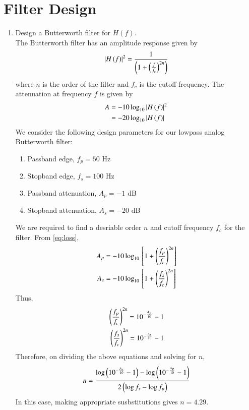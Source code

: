 \documentclass[journal,12pt,twocolumn]{IEEEtran}
\renewcommand\thesection{\arabic{section}}
\begin{document}
\section{Filter Design}
\begin{enumerate}[label=\thesection.\arabic*
	,ref=\thesection.\theenumi]
	\item Design a Butterworth filter for $H(f)$.\\
	\solution The Butterworth filter has an amplitude response
	given by
	\begin{align}
		\left\vert H\left(f\right)\right\vert^2 = \frac{1}{\left(1 + \left(\frac{f}{f_c}\right)^{2n}\right)}
	\end{align}
	where $n$ is the order of the filter and $f_c$ is the cutoff
	frequency. The attenuation at frequency $f$ is given by 
	\begin{align}
		A &= -10\log_{10}\left\vert H\left(f\right)\right\vert^2 \\
		&= -20\log_{10}\left\vert H\left(f\right)\right\vert
		\label{eq:loss}
	\end{align}
	We consider the following design parameters for our
	lowpass analog Butterworth filter:
	\begin{enumerate}
		\item Passband edge, $f_p = 50$ Hz
		\item Stopband edge, $f_s = 100$ Hz
		\item Passband attenuation, $A_p = -1$ dB
		\item Stopband attenuation, $A_s = -20$ dB
	\end{enumerate}
	We are required to find a desriable order $n$ and cutoff
	frequency $f_c$ for the filter. From \eqref{eq:loss},
	\begin{align}
		A_p &= -10\log_{10}{}\left[1 + \left(\frac{f_p}{f_c}\right)^{2n}\right] \\
		A_s &= -10\log_{10}{}\left[1 + \left(\frac{f_s}{f_c}\right)^{2n}\right]
	\end{align}
	Thus,
	\begin{align}
		\left(\frac{f_p}{f_c}\right)^{2n} = 10^{-\frac{A_p}{10}} - 1 \label{eq:fc1} \\
		\left(\frac{f_s}{f_c}\right)^{2n} = 10^{-\frac{A_s}{10}} - 1 \label{eq:fc2}
	\end{align}
	Therefore, on dividing the above equations and solving for $n$,
	\begin{align}
		n = \frac{\log\left(10^{-\frac{A_s}{10}} - 1\right) - 
			\log\left(10^{-\frac{A_p}{10}} - 1\right)}{2\left(\log{f_s} - \log{f_p}\right)}
	\end{align}
	In this case, making appropriate susbstitutions gives $n = 4.29$.

\end{enumerate}
\end{document}
